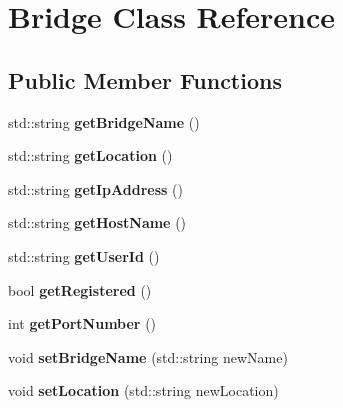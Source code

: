 \hypertarget{classBridge}{}\section{Bridge Class Reference}
\label{classBridge}
\subsection*{Public Member Functions}
\begin{DoxyCompactItemize}
\item 
std\+::string {\bfseries get\+Bridge\+Name} ()\hypertarget{classBridge_a1f078fc27ba8f0fe400f78f5178355a1}{}\label{classBridge_a1f078fc27ba8f0fe400f78f5178355a1}

\item 
std\+::string {\bfseries get\+Location} ()\hypertarget{classBridge_a9c807b40340f2469ffad6a8e48bfee73}{}\label{classBridge_a9c807b40340f2469ffad6a8e48bfee73}

\item 
std\+::string {\bfseries get\+Ip\+Address} ()\hypertarget{classBridge_a8d0ebdced1997f8846ade31234a6ea85}{}\label{classBridge_a8d0ebdced1997f8846ade31234a6ea85}

\item 
std\+::string {\bfseries get\+Host\+Name} ()\hypertarget{classBridge_acd998fba0043a2a2adeccd1a5f35bb79}{}\label{classBridge_acd998fba0043a2a2adeccd1a5f35bb79}

\item 
std\+::string {\bfseries get\+User\+Id} ()\hypertarget{classBridge_ab74c5db6065cedb1aabb0a6a3775900a}{}\label{classBridge_ab74c5db6065cedb1aabb0a6a3775900a}

\item 
bool {\bfseries get\+Registered} ()\hypertarget{classBridge_a5286a8d45ce04a058c2e15730ee47b7b}{}\label{classBridge_a5286a8d45ce04a058c2e15730ee47b7b}

\item 
int {\bfseries get\+Port\+Number} ()\hypertarget{classBridge_ac2ec6b055bffee5f813b1f9b70ab086b}{}\label{classBridge_ac2ec6b055bffee5f813b1f9b70ab086b}

\item 
void {\bfseries set\+Bridge\+Name} (std\+::string new\+Name)\hypertarget{classBridge_aa4ddd6d8f8ba9d86bc5f92fda19cc66c}{}\label{classBridge_aa4ddd6d8f8ba9d86bc5f92fda19cc66c}

\item 
void {\bfseries set\+Location} (std\+::string new\+Location)\hypertarget{classBridge_a23bd543d54d8b90abfa1b441f3a526ca}{}\label{classBridge_a23bd543d54d8b90abfa1b441f3a526ca}


\end{DoxyCompactItemize}
